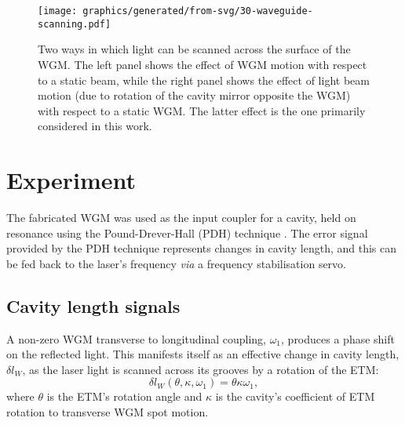 \begin{figure}
  \centering
  \texttt{[image: graphics/generated/from-svg/30-waveguide-scanning.pdf]}
  \caption{\label{fig:waveguide-scanning}Two ways in which light can be scanned across the surface of the \gls{WGM}. The left panel shows the effect of \gls{WGM} motion with respect to a static beam, while the right panel shows the effect of light beam motion (due to rotation of the cavity mirror opposite the \gls{WGM}) with respect to a static \gls{WGM}. The latter effect is the one primarily considered in this work.}
\end{figure}

\section{Experiment}

The fabricated \gls{WGM} was used as the input coupler for a \FP{} cavity, held on resonance using the Pound-Drever-Hall (PDH) technique \cite{Drever1983}. The error signal provided by the PDH technique represents changes in cavity length, and this can be fed back to the laser's frequency \emph{via} a frequency stabilisation servo.

\subsection{Cavity length signals}
\label{sec:lengthsignals}

A non-zero \gls{WGM} transverse to longitudinal coupling, $\omega_1$, produces a phase shift on the reflected light. This manifests itself as an effective change in cavity length, $\delta l_W$, as the laser light is scanned across its grooves by a rotation of the \gls{ETM}:
\begin{equation}
  \delta l_W \left( \theta, \kappa, \omega_1 \right) = \theta \kappa \omega_1,
  \label{eq:wgm-length-change}
\end{equation}
where $\theta$ is the \gls{ETM}'s rotation angle and $\kappa$ is the cavity's coefficient of \gls{ETM} rotation to transverse \gls{WGM} spot motion.

